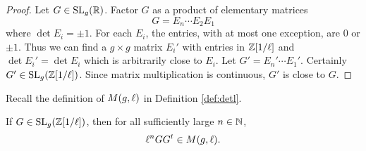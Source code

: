 \documentclass{amsart}
\begin{document}
\begin{proof}
  Let $G \in \operatorname{SL}_g(\mathbb{R})$. Factor $G$ as a product of elementary matrices
  \[
    G = E_n \cdots E_2 E_1
  \]
  where $\det E_i = \pm 1$. For each $E_i$, the entries, with at most one exception, are $0$ or $\pm 1$. Thus we can find a $g \times g$ matrix $E_i'$ with entries in $\mathbb{Z}[1/\ell]$ and $\det E_i' = \det E_i$ which is arbitrarily close to $E_i$. Let $G' = E_n' \cdots E_1'$. Certainly $G' \in \operatorname{SL}_g(\mathbb{Z}[1/\ell])$. Since matrix multiplication is continuous, $G'$ is close to $G$.
\end{proof}





Recall the definition of $M(g,\ell)$ in Definition \ref{def:detl}.

\begin{lemma}\label{lemma:ggt-spd-detl}
  If $G \in \operatorname{SL}_g(\mathbb{Z}[1/\ell])$, then for all sufficiently large $n \in \mathbb{N}$,
  \[
    \ell^n GG^t \in M(g,\ell).
  \]
\end{lemma}
\end{document}
